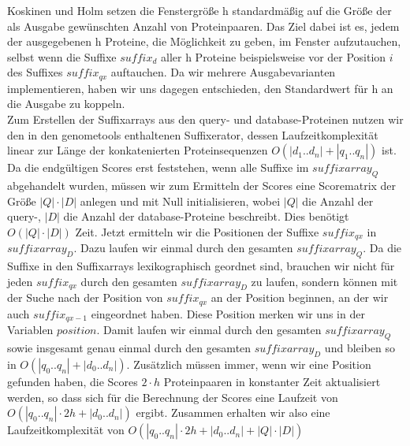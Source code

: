 \documentclass{article}
\begin{document}
Koskinen und Holm setzen die Fenstergröße h standardmäßig auf die Größe der als Ausgabe gewünschten Anzahl von Proteinpaaren. Das Ziel dabei ist es, jedem der ausgegebenen h Proteine, die Möglichkeit zu geben, im Fenster aufzutauchen, selbst wenn die Suffixe $suffix_{d}$ aller h Proteine beispielsweise vor der Position $i$ des Suffixes $suffix_{qx}$ auftauchen. Da wir mehrere Ausgabevarianten implementieren, haben wir uns dagegen entschieden, den Standardwert für h an die Ausgabe zu koppeln.\\
Zum Erstellen der Suffixarrays aus den query- und database-Proteinen nutzen wir den in den genometools enthaltenen Suffixerator, dessen Laufzeitkomplexität linear zur Länge der konkatenierten Proteinsequenzen $O(|d_1..d_n|+|q_1..q_n|)$ ist.
Da die endgültigen Scores erst feststehen, wenn alle Suffixe im $suffixarray_Q$ abgehandelt wurden, müssen wir zum Ermitteln der Scores eine Scorematrix der Größe $|Q|\cdot|D|$ anlegen und mit Null initialisieren, wobei $|Q|$ die Anzahl der query-, $|D|$ die Anzahl der database-Proteine beschreibt. Dies benötigt $O(|Q|\cdot|D|)$ Zeit. Jetzt ermitteln wir die Positionen der Suffixe $suffix_{qx}$ in $suffixarray_D$. Dazu laufen wir einmal durch den gesamten $suffixarray_Q$. Da die Suffixe in den Suffixarrays lexikographisch geordnet sind, brauchen wir nicht für jeden $suffix_{qx}$ durch den gesamten $suffixarray_D$ zu laufen, sondern können mit der Suche nach der Position von $suffix_{qx}$ an der Position beginnen, an der wir auch $suffix_{qx-1}$ eingeordnet haben. Diese Position merken wir uns in der Variablen $position$. Damit laufen wir einmal durch den gesamten $suffixarray_Q$ sowie insgesamt genau einmal durch den gesamten $suffixarray_D$ und bleiben so in $O(|q_0..q_n| + |d_0..d_n|)$. Zusätzlich müssen immer, wenn wir eine Position gefunden haben, die Scores $2 \cdot h$ Proteinpaaren in konstanter Zeit aktualisiert werden, so dass sich für die Berechnung der Scores eine Laufzeit von ${O(|q_0..q_n|\cdot2h + |d_0..d_n|)}$ ergibt. Zusammen erhalten wir also eine Laufzeitkomplexität von  ${O(|q_0..q_n|\cdot2h + |d_0..d_n|+|Q|\cdot|D|)}$
\end{document}
